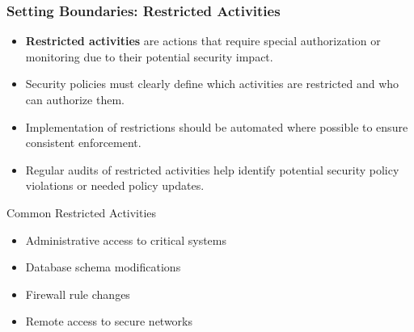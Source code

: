 \documentclass{beamer}
\begin{document}
            \begin{frame}
            \frametitle{Setting Boundaries: Restricted Activities}
            \begin{itemize}
                \item \textbf{Restricted activities} are actions that require special authorization or monitoring due to their potential security impact.
                
                \item Security policies must clearly define which activities are restricted and who can authorize them.
                
                \item Implementation of restrictions should be automated where possible to ensure consistent enforcement.
                
                \item Regular audits of restricted activities help identify potential security policy violations or needed policy updates.
            \end{itemize}
            \begin{block}{Common Restricted Activities}
            \begin{itemize}
                \item Administrative access to critical systems
                \item Database schema modifications
                \item Firewall rule changes
                \item Remote access to secure networks
            \end{itemize}
            \end{block}
            \end{frame}
            
\end{document}
